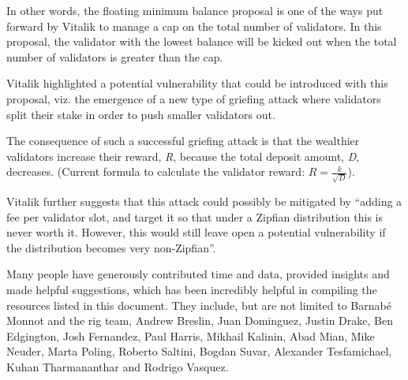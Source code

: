 \documentclass[UTF8]{article}
\begin{document}
In other words, the floating minimum balance proposal is one of the ways put forward by Vitalik to manage a cap on the total number of validators. In this proposal, the validator with the lowest balance will be kicked out when the total number of validators is greater than the cap. 

Vitalik highlighted a potential vulnerability that could be introduced with this proposal, viz. the emergence of a new type of griefing attack \cite{Buterin2018c} where validators split their stake in order to push smaller validators out. 

The consequence of such a successful griefing attack is that the wealthier validators increase their reward, \textit{R}, because the total deposit amount, \textit{D}, decreases. (Current formula to calculate the validator reward: $R = \frac{k}{\sqrt{D}}$).

Vitalik further suggests that this attack could possibly be mitigated by ``adding a fee per validator slot, and target it so that under a Zipfian distribution this is never worth it. However, this would still leave open a potential vulnerability if the distribution becomes very non-Zipfian''. 

Many people have generously contributed time and data, provided insights and made helpful suggestions, which has been incredibly helpful in compiling the resources listed in this document. They include, but are not limited to Barnab\'e Monnot and the \gls{rig} team, Andrew Breslin, Juan Dominguez, Justin Drake,  Ben Edgington, Josh Fernandez, Paul Harris, Mikhail Kalinin, Abad Mian, Mike Neuder, Marta Poling, Roberto Saltini, Bogdan Suvar, Alexander Tesfamichael, Kuhan Tharmananthar and Rodrigo Vasquez.

\end{document}
